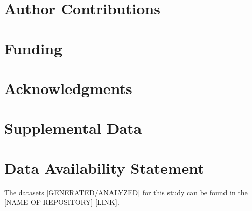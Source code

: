 \documentclass[utf8]{frontiersSCNS} %
\begin{document}
\section*{Author Contributions}


\section*{Funding}

\section*{Acknowledgments}

\section*{Supplemental Data}

\section*{Data Availability Statement}
The datasets [GENERATED/ANALYZED] for this study can be found in the [NAME OF REPOSITORY] [LINK].
\end{document}
